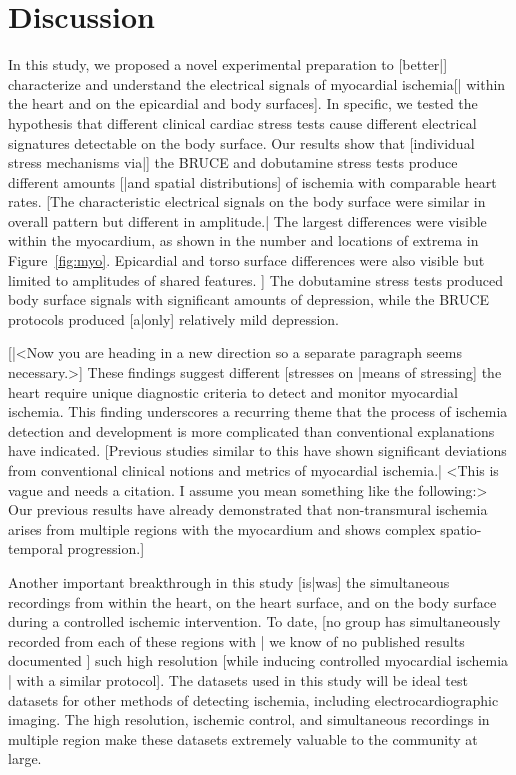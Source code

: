 \documentclass[twocolumn]{cinc}
\begin{document}
\section{Discussion}

In this study, we proposed a novel experimental preparation to [better|]
characterize and understand the electrical signals of myocardial ischemia[|
within the heart and on the epicardial and body surfaces]. In specific, we
tested the hypothesis that different clinical cardiac stress tests cause
different electrical signatures detectable on the body surface. Our results
show that [individual stress mechanisms via|] the BRUCE and dobutamine
stress tests produce different amounts [|and spatial distributions] of
ischemia with comparable heart rates. [The characteristic electrical
signals on the body surface were similar in overall pattern but different
in amplitude.| The largest differences were visible within the myocardium,
as shown in the number and locations of extrema in Figure~\ref{fig:myo}.
Epicardial and torso surface differences were also visible but limited to
amplitudes of shared features. ] The dobutamine stress tests produced body
surface signals with significant amounts of depression, while the BRUCE
protocols produced [a|only] relatively mild depression.

[|<Now you are heading in a new direction so a separate paragraph seems
necessary.>] These findings suggest different [stresses on |means of
stressing] the heart require unique diagnostic criteria to detect and
monitor myocardial ischemia. This finding underscores a recurring theme
that the process of ischemia detection and development is more complicated
than conventional explanations have indicated. [Previous studies similar to
this have shown significant deviations from conventional clinical notions
and metrics of myocardial ischemia.| <This is vague and needs a citation.
I assume you mean something like the following:> Our previous results have
already demonstrated that non-transmural ischemia arises from multiple
regions with the myocardium and shows complex spatio-temporal
progression.\cite{}]

Another important breakthrough in this study [is|was] the simultaneous
recordings from within the heart, on the heart surface, and on the body
surface during a controlled ischemic intervention. To date, [no group has
simultaneously recorded from each of these regions with | we know of no
published results documented ] such high resolution [while inducing
controlled myocardial ischemia | with a similar protocol]. The datasets used
in this study will be ideal test datasets for other methods of detecting
ischemia, including electrocardiographic imaging. The high resolution,
ischemic control, and simultaneous recordings in multiple region make these
datasets extremely valuable to the community at large.
\end{document}
